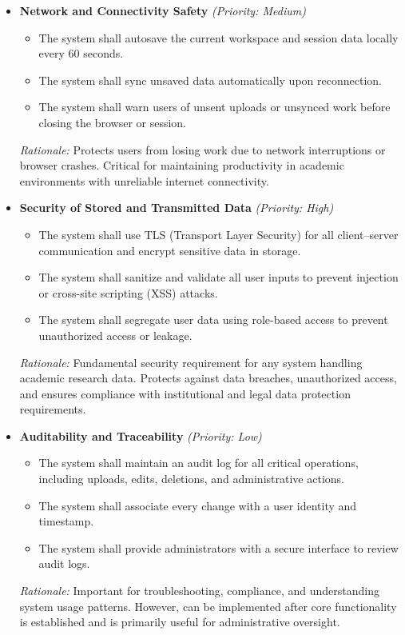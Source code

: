 \documentclass{article}
\begin{document}
\begin{itemize}
    \item \textbf{Network and Connectivity Safety} \textit{(Priority: Medium)}
    \begin{itemize}
        \item The system shall autosave the current workspace and session data locally every 60 seconds.
        \item The system shall sync unsaved data automatically upon reconnection.
        \item The system shall warn users of unsent uploads or unsynced work before closing the browser or session.
    \end{itemize}
    \textit{Rationale:} Protects users from losing work due to network interruptions or browser crashes. Critical for maintaining productivity in academic environments with unreliable internet connectivity.

    \item \textbf{Security of Stored and Transmitted Data} \textit{(Priority: High)}
    \begin{itemize}
        \item The system shall use TLS (Transport Layer Security) for all client–server communication and encrypt sensitive data in storage.
        \item The system shall sanitize and validate all user inputs to prevent injection or cross-site scripting (XSS) attacks.
        \item The system shall segregate user data using role-based access to prevent unauthorized access or leakage.
    \end{itemize}
    \textit{Rationale:} Fundamental security requirement for any system handling academic research data. Protects against data breaches, unauthorized access, and ensures compliance with institutional and legal data protection requirements.

    \item \textbf{Auditability and Traceability} \textit{(Priority: Low)}
    \begin{itemize}
        \item The system shall maintain an audit log for all critical operations, including uploads, edits, deletions, and administrative actions.
        \item The system shall associate every change with a user identity and timestamp.
        \item The system shall provide administrators with a secure interface to review audit logs.
    \end{itemize}
    \textit{Rationale:} Important for troubleshooting, compliance, and understanding system usage patterns. However, can be implemented after core functionality is established and is primarily useful for administrative oversight.

\end{itemize}
\end{document}
